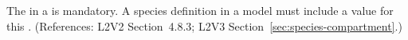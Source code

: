 The   in a \Species is mandatory.  A species
definition in a model must include a value for this .  (References:
L2V2 Section~4.8.3; L2V3 Section~\ref{sec:species-compartment}.)
